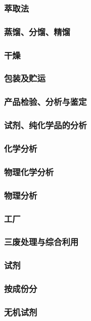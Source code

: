 \documentclass[UTF8]{../../ApplicationUniverse}
\begin{document}
        \subsubsection{萃取法}
        \subsubsection{蒸馏、分馏、精馏}
        \subsubsection{干燥}
        \subsubsection{包装及贮运}
    \subsubsection{产品检验、分析与鉴定}
        \subsubsection{试剂、纯化学品的分析}
            \subsubsection{化学分析}
            \subsubsection{物理化学分析}
            \subsubsection{物理分析}
    \subsubsection{工厂}
    \subsubsection{三废处理与综合利用}
\subsubsection{试剂}
    \subsubsection{按成份分}
        \subsubsection{无机试剂}
\end{document}
